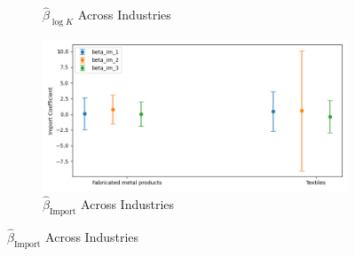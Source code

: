 \documentclass{article}
\begin{document}
\begin{figure}[ht!]
\begin{subfigure}[t]{0.32\textwidth}
        \caption{$\hat{\beta}_{\log K}$ Across Industries}
    \end{subfigure}
    \begin{subfigure}[t]{0.32\textwidth}
        \centering
        \includegraphics[width=\textwidth]{figure/ar1_mixture_kmshare_ciiu_beta_im_across_industries_m3.png}
        \caption{$\hat{\beta}_{\text{Import}}$ Across Industries}
    \end{subfigure}
\end{figure}
\end{document}
